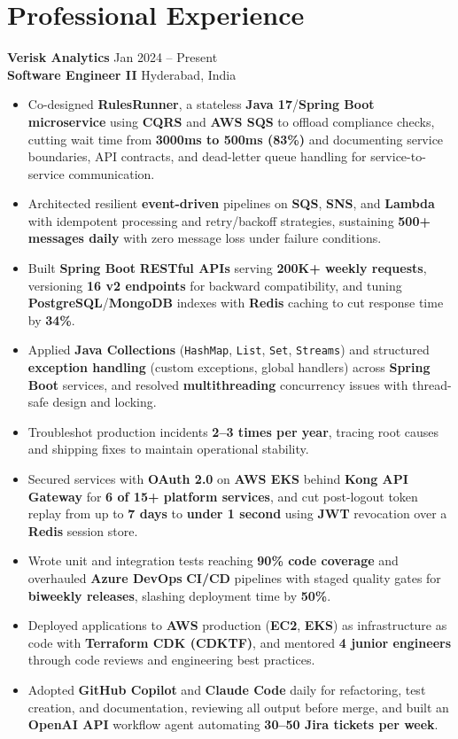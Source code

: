 \documentclass[a4paper,10pt]{article}
\begin{document}
\section*{Professional Experience}

\textbf{Verisk Analytics} \hfill Jan 2024 -- Present \\
\textbf{Software Engineer II} \hfill Hyderabad, India

\begin{itemize}[leftmargin=*]
    \item Co-designed \textbf{RulesRunner}, a stateless \textbf{Java 17}/\textbf{Spring Boot} \textbf{microservice} using \textbf{CQRS} and \textbf{AWS SQS} to offload compliance checks, cutting wait time from \textbf{3000ms to 500ms (83\%)} and documenting service boundaries, API contracts, and dead-letter queue handling for service-to-service communication.
    \item Architected resilient \textbf{event-driven} pipelines on \textbf{SQS}, \textbf{SNS}, and \textbf{Lambda} with idempotent processing and retry/backoff strategies, sustaining \textbf{500+ messages daily} with zero message loss under failure conditions.
    \item Built \textbf{Spring Boot} \textbf{RESTful APIs} serving \textbf{200K+ weekly requests}, versioning \textbf{16 v2 endpoints} for backward compatibility, and tuning \textbf{PostgreSQL}/\textbf{MongoDB} indexes with \textbf{Redis} caching to cut response time by \textbf{34\%}.
    \item Applied \textbf{Java Collections} (\texttt{HashMap}, \texttt{List}, \texttt{Set}, \texttt{Streams}) and structured \textbf{exception handling} (custom exceptions, global handlers) across \textbf{Spring Boot} services, and resolved \textbf{multithreading} concurrency issues with thread-safe design and locking.
    \item Troubleshot production incidents \textbf{2--3 times per year}, tracing root causes and shipping fixes to maintain operational stability.
    \item Secured services with \textbf{OAuth 2.0} on \textbf{AWS EKS} behind \textbf{Kong API Gateway} for \textbf{6 of 15+ platform services}, and cut post-logout token replay from up to \textbf{7 days} to \textbf{under 1 second} using \textbf{JWT} revocation over a \textbf{Redis} session store.
    \item Wrote unit and integration tests reaching \textbf{90\% code coverage} and overhauled \textbf{Azure DevOps} \textbf{CI/CD} pipelines with staged quality gates for \textbf{biweekly releases}, slashing deployment time by \textbf{50\%}.
    \item Deployed applications to \textbf{AWS} production (\textbf{EC2}, \textbf{EKS}) as infrastructure as code with \textbf{Terraform CDK (CDKTF)}, and mentored \textbf{4 junior engineers} through code reviews and engineering best practices.
    \item Adopted \textbf{GitHub Copilot} and \textbf{Claude Code} daily for refactoring, test creation, and documentation, reviewing all output before merge, and built an \textbf{OpenAI API} workflow agent automating \textbf{30--50 Jira tickets per week}.
\end{itemize}
\end{document}

